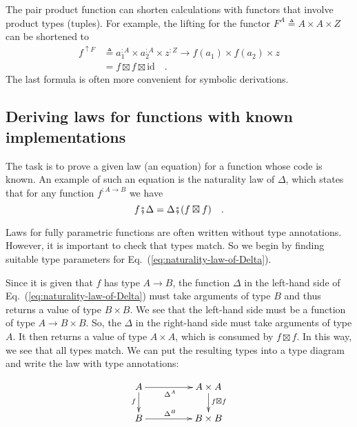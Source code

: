 The pair product function can shorten calculations with functors that
involve product types (tuples). For example, the lifting for the functor
$F^{A}\triangleq A\times A\times Z$ can be shortened to
\begin{align*}
f^{\uparrow F} & \triangleq a_{1}^{:A}\times a_{2}^{:A}\times z^{:Z}\rightarrow f(a_{1})\times f(a_{2})\times z\\
 & =f\boxtimes f\boxtimes\text{id}\quad.
\end{align*}
The last formula is often more convenient for symbolic derivations. 

\subsection{Deriving laws for functions with known implementations}

The task is to prove a given law (an equation) for a function whose
code is known. An example of such an equation is the naturality
law of $\Delta$, which states that for any function $f^{:A\rightarrow B}$
we have
\begin{equation}
f\bef\Delta=\Delta\bef(f\boxtimes f)\quad.\label{eq:naturality-law-of-Delta}
\end{equation}

Laws for fully parametric functions are often written without type
annotations. However, it is important to check that types match. So
we begin by finding suitable type parameters for Eq.~(\ref{eq:naturality-law-of-Delta}).

Since it is given that $f$ has type $A\rightarrow B$, the function
$\Delta$ in the left-hand side of Eq.~(\ref{eq:naturality-law-of-Delta})
must take arguments of type $B$ and thus returns a value of type
$B\times B$. We see that the left-hand side must be a function of
type $A\rightarrow B\times B$. So, the $\Delta$ in the right-hand
side must take arguments of type $A$. It then returns a value of
type $A\times A$, which is consumed by $f\boxtimes f$. In this way,
we see that all types match. We can put the resulting types into a
type diagram and write the law with type annotations:

\begin{wrapfigure}{L}{0.3\columnwidth}%
\vspace{-2.12\baselineskip}
\[
\xymatrix{\xyScaleY{1.6pc}\xyScaleX{4.0pc}A\ar[d]\sb(0.45){f}\ar[r]\sb(0.45){\Delta^{A}} & A\times A\ar[d]\sp(0.45){f\boxtimes f}\\
B\ar[r]\sp(0.45){\Delta^{B}} & B\times B
}
\]
\vspace{-0.1\baselineskip}
\end{wrapfigure}%

